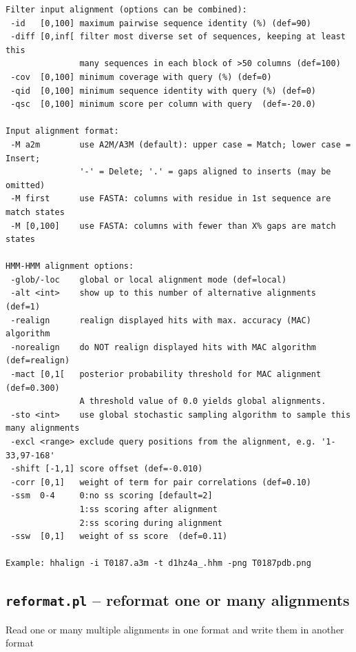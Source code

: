 \documentclass[11pt,a4paper]{article}
\begin{document}
\begin{verbatim}
Filter input alignment (options can be combined):                         
 -id   [0,100] maximum pairwise sequence identity (%) (def=90)   
 -diff [0,inf[ filter most diverse set of sequences, keeping at least this    
               many sequences in each block of >50 columns (def=100)
 -cov  [0,100] minimum coverage with query (%) (def=0) 
 -qid  [0,100] minimum sequence identity with query (%) (def=0) 
 -qsc  [0,100] minimum score per column with query  (def=-20.0)

Input alignment format:                                                     
 -M a2m        use A2M/A3M (default): upper case = Match; lower case = Insert;
               '-' = Delete; '.' = gaps aligned to inserts (may be omitted)   
 -M first      use FASTA: columns with residue in 1st sequence are match states
 -M [0,100]    use FASTA: columns with fewer than X% gaps are match states   

HMM-HMM alignment options:                                                  
 -glob/-loc    global or local alignment mode (def=local)         
 -alt <int>    show up to this number of alternative alignments (def=1)    
 -realign      realign displayed hits with max. accuracy (MAC) algorithm 
 -norealign    do NOT realign displayed hits with MAC algorithm (def=realign)
 -mact [0,1[   posterior probability threshold for MAC alignment (def=0.300) 
               A threshold value of 0.0 yields global alignments.
 -sto <int>    use global stochastic sampling algorithm to sample this many alignments
 -excl <range> exclude query positions from the alignment, e.g. '1-33,97-168'
 -shift [-1,1] score offset (def=-0.010)                                      
 -corr [0,1]   weight of term for pair correlations (def=0.10)               
 -ssm  0-4     0:no ss scoring [default=2]               
               1:ss scoring after alignment                                  
               2:ss scoring during alignment                                 
 -ssw  [0,1]   weight of ss score  (def=0.11)                               

Example: hhalign -i T0187.a3m -t d1hz4a_.hhm -png T0187pdb.png 
\end{verbatim} 
\normalsize


\subsection{{\tt reformat.pl} -- reformat one or many alignments}

Read one or many multiple alignments in one format and write them in another format
\end{document}
